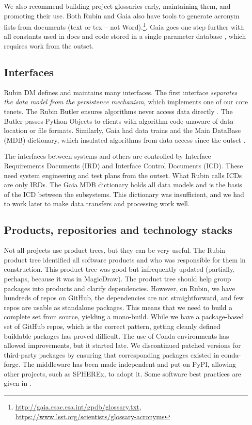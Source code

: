 \documentclass[11pt,twoside]{article}
\begin{document}
We also recommend building project glossaries early, maintaining them, and promoting their use.
Both Rubin and Gaia also have tools to generate acronym lists from documents (text or tex -- not Word).\footnote{\url{http://gaia.esac.esa.int/gpdb/glossary.txt}, \url{https://www.lsst.org/scientists/glossary-acronyms}}. Gaia goes one step further with all constants used in docs and code stored in a single parameter database \citep{2005ESASP.576...67D}, which requires work from the outset.


\subsection{Interfaces}
Rubin DM defines and maintains many interfaces.
The first interface \emph{separates the data model from the persistence mechanism}, which implements one of our core tenets.
The Rubin Butler ensures algorithms never access data directly \citep{2022SPIE12189E..11J,2019ASPC..523..653J,C24_adassxxxii,P52_adassxxxii}.
The Butler passes Python Objects to clients with algorithm code unaware of data location or file formats.
Similarly, Gaia had data trains and the Main DataBase (MDB) dictionary, which insulated algorithms from data access since the outset \citep{1999BaltA...8...57O}.

The interfaces between systems and others are controlled by Interface Requirements Documents (IRD) and Interface Control Documents (ICD).
These need system engineering and test plans from the outset.
What Rubin calls ICDs are only IRDs.
The Gaia MDB dictionary holds all data models \citep{2015ASPC..495...47H, 2011ASPC..442..351O} and is the basis of the ICD between the subsystems.
This dictionary was insufficient, and we had to work later to make data transfers and processing work well.

\subsection{Products, repositories and technology stacks}

Not all projects use product trees, but they can be very useful.
The Rubin product tree identified all software products and who was responsible for them in construction.
This product tree was good but infrequently updated (partially, perhaps, because it was in MagicDraw).
The product tree should help group packages into products and clarify dependencies.
However, on Rubin, we have hundreds of repos on GitHub, the dependencies are not straightforward, and few repos are usable as standalone packages.
This means that we need to build a complete set from source, yielding a
 mono-build.
 While we have a package-based set of GitHub repos, which is the correct pattern, getting cleanly defined buildable packages has proved difficult.
The use of Conda environments has allowed improvements, but it started late.
We discontinued patched versions for third-party packages by ensuring that corresponding packages existed in conda-forge.
The middleware has been made independent and put on PyPI, allowing other projects, such as SPHEREx, to adopt it.
Some software best practices are given in \citet{2018SPIE10707E..09J}.
\end{document}
